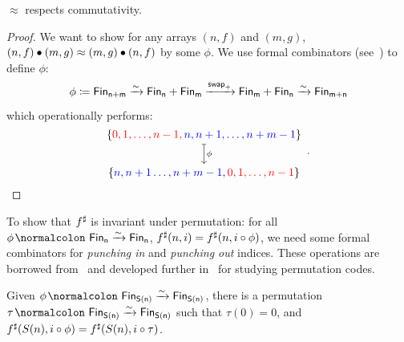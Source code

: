 %
\begin{proposition}
    \label{bag:comm}
    $\approx$ respects commutativity.
\end{proposition}

\begin{proof}
    We want to show for any arrays $(n, f)$ and $(m, g)$, $(n, f) \mathbin{\bullet} (m, g) \approx (m, g) \mathbin{\bullet} (n, f)$
    by some $\phi$.
    We use formal combinators (see~\cite{choudhurySymmetriesReversibleProgramming2022}) to define $\phi$:
    \[
        \phi \defeq \Fin[n+m] \xto{\sim} \Fin[n] + \Fin[m] \xto{\term{swap}_{+}} \Fin[m] + \Fin[n] \xto{\sim} \Fin[m+n] \\
    \]
    which operationally performs:
    \[
        \begin{tikzcd}[ampersand replacement=\&,cramped]
            {\{\color{red}0,1,\dots,n-1, \color{blue} n,n+1,\dots,n+m-1 \color{black}\}} \\
            { \{\color{blue}n,n+1\dots,n+m-1, \color{red}0,1,\dots,n-1 \color{black}\}}
            \arrow["\phi", maps to, from=1-1, to=2-1]
        \end{tikzcd}
        \enspace.
    \]
\end{proof}
%
To show that ${f}^{\sharp}$ is invariant under permutation: for all $\phi\colon \Fin[n]\xto{\sim}\Fin[n]$,
$\ext{f}(n, i) \id \ext{f}(n, i \circ \phi)$, we need some formal combinators for
\emph{punching in} and \emph{punching out} indices. These operations are
borrowed from~\cite{mozlerCubicalAgdaSimple2021} and
developed further
in~\cite{choudhurySymmetriesReversibleProgramming2022} for studying permutation codes.
%
\begin{lemma}
    \label{bag:tau}
    Given $\phi\colon \Fin[S(n)]\xto{\sim}\Fin[S(n)]$, there is a permutation $\tau\colon \Fin[S(n)]\xto{\sim}\Fin[S(n)]$
    such that $\tau(0) = 0$, and ${f}^{\sharp}(S(n), i \circ \phi) = {f}^{\sharp}(S(n), i \circ \tau)$.
\end{lemma}

